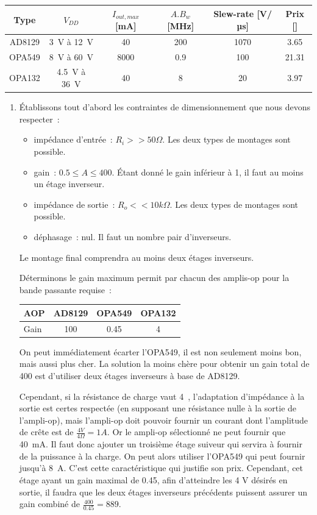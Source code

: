 \documentclass{template/tp}
\begin{document}
{	\begin{center}
		\begin{tabular}{|c|c|c|c|c|c|} \hline
		Type & $V_{DD}$ & $I_{out, max}$ [mA] & $A.B_w$ [MHz] & Slew-rate [V/µs] & Prix [\EUR] \\ \hline
		AD8129 & 3~V à 12~V & 40 & 200 & 1070 & 3.65 \\ \hline %
		OPA549 & 8~V à 60~V & 8000 & 0.9 & 100 & 21.31 \\ \hline
		OPA132 & 4.5~V à 36~V & 40 & 8 & 20 & 3.97 \\ \hline
		\end{tabular}
	\end{center}
}
{
	\begin{enumerate}
		\item Établissons tout d'abord les contraintes de dimensionnement que nous devons respecter~:
		\begin{itemize}
			\item impédance d'entrée~: $R_i >> 50 \Omega$. Les deux types de montages sont possible.
			\item gain~: $0.5 \leq A \leq 400$. Étant donné le gain inférieur à 1, il faut au moins un étage inverseur.
			\item impédance de sortie~: $R_o << 10 k\Omega$. Les deux types de montages sont possible.
			\item déphasage~: nul. Il faut un nombre pair d'inverseurs.
		\end{itemize}

		Le montage final comprendra au moins deux étages inverseurs.

		Déterminons le gain maximum permit par chacun des amplis-op pour la bande passante requise~:

		\begin{center}
			\begin{tabular}{l|c|c|c}
			AOP & AD8129 & OPA549 & OPA132 \\ \hline
			Gain & 100 & 0.45 & 4 \\
			\end{tabular}
		\end{center}

		On peut immédiatement écarter l'OPA549, il est non seulement moins bon, mais aussi plus cher.
		La solution la moins chère pour obtenir un gain total de 400 est d'utiliser deux étages inverseurs à base de AD8129.

		Cependant, si la résistance de charge vaut 4~\ohm, l'adaptation d'impédance à la sortie est certes respectée (en supposant une résistance nulle à la sortie de l'ampli-op), mais l'ampli-op doit pouvoir fournir un courant dont l'amplitude de crête est de $\frac{4V}{4\Omega} = 1 A$.
		Or le ampli-op sélectionné ne peut fournir que 40~mA.
		Il faut donc ajouter un troisième étage suiveur qui servira à fournir de la puissance à la charge.
		On peut alors utiliser l'OPA549 qui peut fournir jusqu'à 8~A.
		C'est cette caractéristique qui justifie son prix.
		Cependant, cet étage ayant un gain maximal de 0.45, afin d'atteindre les 4 V désirés en sortie, il faudra que les deux étages inverseurs précédents puissent assurer un gain combiné de $\frac{400}{0.45} = 889$.


\end{enumerate}}
\end{document}

